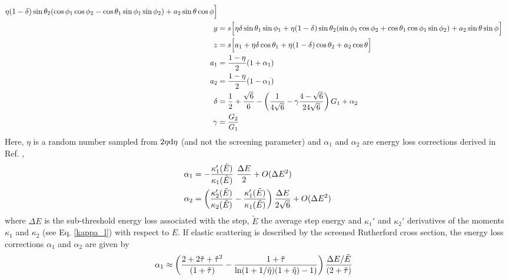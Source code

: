 \begin{itemize}
\begin{equation}
\begin{split}
\eta (1 - \delta) \sin \theta_2 ( \cos \phi_1 \cos \phi_2 - 
\cos \theta_1 \sin \phi_1 \sin \phi_2 ) + 
a_2 \sin \theta \cos \phi \Big] \\
y & = s \Big[ \eta \delta \sin \theta_1 \sin \phi_1 +
\eta (1 - \delta) \sin \theta_2 ( \sin \phi_1 \cos \phi_2 + 
\cos \theta_1 \cos \phi_1 \sin \phi_2 ) + 
a_2 \sin \theta \sin \phi \Big] \\
z & = s \Big[ a_1 + \eta \delta \cos \theta_1 +
\eta (1 - \delta) \cos \theta_2 +
a_2 \cos \theta \Big] \\
a_1 & = {1 - \eta \over 2} (1 + \alpha_1) \\
a_2 & = {1 - \eta \over 2} (1 - \alpha_1) \\
\delta & = {1 \over 2} + {\sqrt{6} \over 6} - 
\left( {1 \over 4 \sqrt{6}} - \gamma {4 - \sqrt{6} \over 24 \sqrt{6}} 
\right) G_1 + \alpha_2 \\
\gamma & = {G_2 \over G_1}
\end{split}
\end{equation}
Here, $\eta$ is a random number sampled from $2 \eta {\rm d} \eta$ 
(and not the screening parameter) and $\alpha_1$ and $\alpha_2$ 
are energy loss corrections derived in Ref. \cite{Ka99a},
\begin{equation}
\label{eloss_correction}
\begin{split}
\alpha_1 & = - {\kappa_1'(\tilde{E}) \over \kappa_1(\tilde{E})}~
{\Delta E \over 2} + O(\Delta E^2) \\
\alpha_2 & = \left( {\kappa_2'(\tilde{E}) \over \kappa_2(\tilde{E})}
- {\kappa_1'(\tilde{E}) \over \kappa_1(\tilde{E})} \right) {\Delta E \over 
2 \sqrt{6} } + O(\Delta E^2)
\end{split}
\end{equation}
where $\Delta E$ is the sub-threshold energy loss associated 
with the step, $\tilde{E}$ the average step energy and 
$\kappa_1'$ and $\kappa_2'$ derivatives of the 
moments $\kappa_1$ and $\kappa_2$ (see Eq. \eqref{kappa_l}) 
with respect to $E$.  
If elastic scattering is described by the screened Rutherford 
cross section, the energy loss corrections $\alpha_1$ and 
$\alpha_2$ are given by 
\begin{equation}
\label{eloss_correction_SR}
\begin{split}
\alpha_1 & \approx \left( {2 + 2 \tilde{\tau} + \tilde{\tau}^2 \over 
(1 + \tilde{\tau}) } - {1 + \tilde{\tau} \over 
\ln(1 + 1/\tilde{\eta}) (1 + \tilde{\eta}) - 1) } \right) 
{\Delta E/\tilde{E} \over  (2 + \tilde{\tau})}

\end{split}
\end{equation}
\end{itemize}
